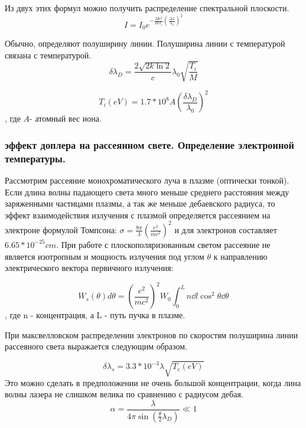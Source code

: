 \documentclass[10pt, a4paper]{article}
\begin{document}
Из двух этих формул можно получить распределение спектральной плоскости.
\begin{equation}
	I=I_0 e^{-\frac{Mc^{2}}{2kT_i} (\frac{\Delta \lambda}{\lambda_0})^{2}}
\end{equation}

Обычно, определяют полуширину линии. Полуширина линии с температурой связана с температурой.
\begin{equation}
	\delta \lambda_D=\frac{2 \sqrt{2k \ln{2}}}{c} \lambda_0 \sqrt{\frac{T_i}{M}}
\end{equation}


\begin{equation}
	T_i(eV)=1.7*10^{8}A\left(\frac{\delta \lambda_D}{\lambda_0}\right)^{2}
\end{equation}
, где $A$- атомный вес иона.

\subsubsection{эффект доплера на рассеянном свете. Определение электронной температуры.}

Рассмотрим рассеяние монохроматического луча в плазме (оптически тонкой). Если длина волны падающего света много меньше среднего расстояния между заряженными частицами плазмы, а так же меньше дебаевского радиуса, то эффект взаимодействия излучения с плазмой определяется рассеянием на электроне формулой Томпсона: $\sigma =\frac{8\pi}{3} (\frac{e^{2}}{mc^{2}})^{2}$ и для электронов составляет $6.65*10^{-25} cm$.
При работе с плоскополяризованным светом рассеяние не является изотропным и мощность излучения под углом $\theta$ к направлению электрического вектора первичного излучения:

\begin{equation}
	W_{s} (\theta) d\theta=\left(\frac{e^{2}}{mc^{2}}\right)^{2} W_0 \int_{0}^{L} n \dd l \cos^{2}\theta \dd \theta
\end{equation}
, где n -  концентрация, а L - путь пучка в плазме.

При максвелловском распределении электронов по скоростям полуширина линии рассеяного света выражается следующим образом.

\begin{equation}
	\delta \lambda_s = 3.3*10^{-3} \lambda \sqrt{T_e (eV)}
\end{equation}
Это можно сделать в предположении не очень большой концентрации, когда лина волны лазера не слишком велика по сравнению с радиусом дебая.
\begin{equation}
	\alpha = \frac{\lambda}{4\pi \sin(\frac{\theta}{2} \lambda_D)} \ll 1
\end{equation}
\end{document}
